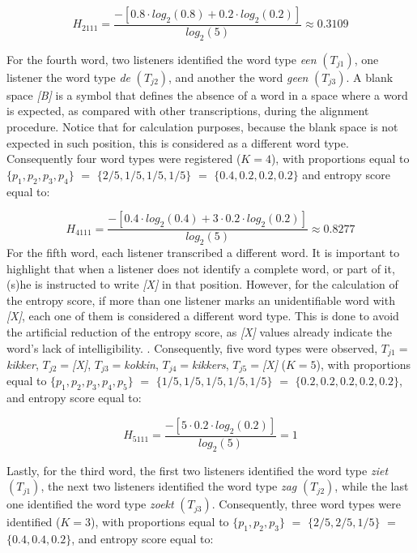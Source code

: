 \documentclass[
  authoryear,
  preprint,
  1p]{elsarticle}
\begin{document}
\[ 
H_{2111} = \frac{ -\left[ 0.8 \cdot log_{2}(0.8) + 0.2 \cdot log_{2}(0.2) \right] }{ log_{2}(5)} \approx 0.3109
\]

{For the fourth word, two listeners identified the word type \emph{een}
\((T_{j1})\), one listener the word type \emph{de} \((T_{j2})\), and
another the word \emph{geen} \((T_{j3})\).} A blank space \emph{{[}B{]}}
is a symbol that defines the absence of a word in a space where a word
is expected, as compared with other transcriptions, during the alignment
procedure. Notice that for calculation purposes, because the blank space
is not expected in such position, this is considered as a different word
type. Consequently four word types were registered (\(K=4\)), with
proportions equal to \(\{ p_{1}, p_{2}, p_{3}, p_{4} \}\) \(=\)
\(\{ 2/5, 1/5, 1/5, 1/5 \}\) \(=\) \(\{ 0.4, 0.2, 0.2, 0.2 \}\) and
entropy score equal to:

\[ 
H_{4111} = \frac{ -\left[ 0.4 \cdot log_{2}(0.4) + 3 \cdot 0.2 \cdot log_{2}(0.2) \right] }{ log_{2}(5)} \approx 0.8277
\] {For the fifth word, each listener transcribed a different word.} It
is important to highlight that when a listener does not identify a
complete word, or part of it, (s)he is instructed to write
\emph{{[}X{]}} in that position. However, for the calculation of the
entropy score, if more than one listener marks an unidentifiable word
with \emph{{[}X{]}}, each one of them is considered a different word
type. This is done to avoid the artificial reduction of the entropy
score, as \emph{{[}X{]}} values already indicate the word's lack of
intelligibility. . Consequently, five word types were observed,
\(T_{j1}=\)\emph{kikker}, \(T_{j2}=\)\emph{{[}X{]}},
\(T_{j3}=\)\emph{kokkin}, \(T_{j4}=\)\emph{kikkers},
\(T_{j5}=\)\emph{{[}X{]}} (\(K=5\)), with proportions equal to
\(\{ p_{1}, p_{2}, p_{3}, p_{4}, p_{5} \}\) \(=\)
\(\{ 1/5, 1/5, 1/5, 1/5, 1/5 \}\) \(=\)
\(\{ 0.2, 0.2, 0.2, 0.2, 0.2 \}\), and entropy score equal to:

\[ 
H_{5111} = \frac{ -\left[ 5 \cdot 0.2 \cdot log_{2}(0.2) \right] }{ log_{2}(5)} = 1
\]

{Lastly, for the third word, the first two listeners identified the word
type \emph{ziet} \((T_{j1})\), the next two listeners identified the
word type \emph{zag} \((T_{j2})\), while the last one identified the
word type \emph{zoekt} \((T_{j3})\). Consequently, three word types were
identified (\(K=3\)), with proportions equal to
\(\{ p_{1}, p_{2}, p_{3} \}\) \(=\) \(\{ 2/5, 2/5, 1/5 \}\) \(=\)
\(\{ 0.4, 0.4, 0.2 \}\), and entropy score equal to:}
\end{document}
